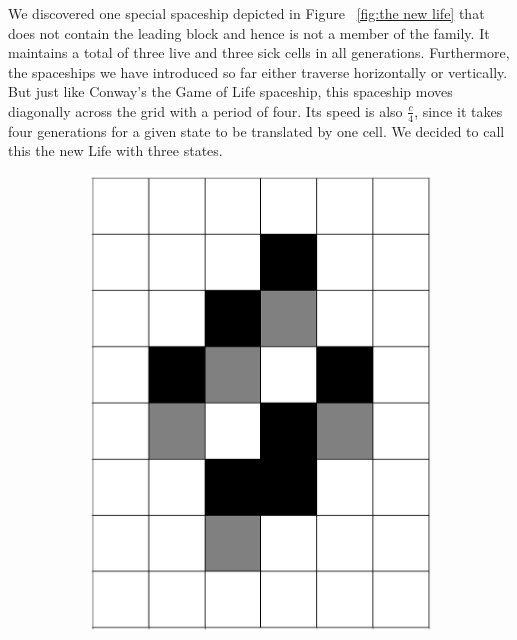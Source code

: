 \documentclass[12pt]{article}
\numberwithin{figure}{section} %
\begin{document}
We discovered one special spaceship depicted in Figure ~\ref{fig:the new life} that does not contain the leading block and hence is not a member of the family. It maintains a total of three live and three sick cells in all generations. Furthermore, the spaceships we have introduced so far either traverse horizontally or vertically. But just like Conway’s the Game of Life spaceship, this spaceship moves diagonally across the grid with a period of four. Its speed is also $\frac{c}{4}$, since it takes four generations for a given state to be translated by one cell. We decided to call this the new Life with three states.
\begin{figure}[H]
	\begin{subfigure}{0.16\textwidth}
     		\centering
     		\includegraphics[width=\linewidth]{Section4/21.0}
     		\subcaption{}
   	\end{subfigure}
     	\begin{subfigure}{0.16\textwidth}
     		\centering

\end{subfigure}
\end{figure}
\end{document}
